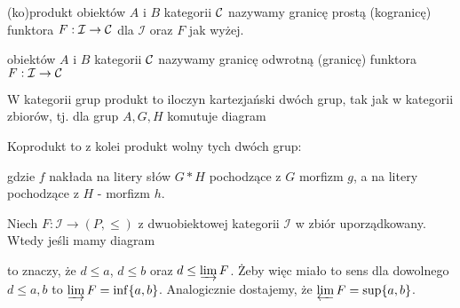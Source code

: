 {\begin{definition}{(ko)produkt}{}
   obiektów $A$ i $B$ kategorii $\mathcal{C}$ nazywamy granicę prostą (kogranicę) funktora $F:\mathcal{I}\to \mathcal{C}$ dla $\mathcal{I}$ oraz $F$ jak wyżej.

   obiektów $A$ i $B$ kategorii $\mathcal{C}$ nazywamy granicę odwrotną (granicę) funktora $F:\mathcal{I}\to\mathcal{C}$
\end{definition}

\begin{example}[m]
  \item W kategorii grup produkt to iloczyn kartezjański dwóch grup, tak jak w kategorii zbiorów, tj. dla grup $A,G,H$ komutuje diagram
    \begin{center}
    \end{center}
    Koprodukt to z kolei produkt wolny tych dwóch grup:
\begin{center}
\end{center}
gdzie $f$ nakłada na litery słów $G\ast H$ pochodzące z $G$ morfizm $g$, a na litery pochodzące z $H$ - morfizm $h$.
  \item Niech $F:\mathcal{I}\to (P, \leq)$ z dwuobiektowej kategorii $\mathcal{I}$ w zbiór uporządkowany. Wtedy jeśli mamy diagram 
    \begin{center}
    \end{center}
    to znaczy, że $d\leq a$, $d\leq b$ oraz $d\leq \varinjlim{F}$. Żeby więc miało to sens dla dowolnego $d\leq a,b$ to $\varinjlim F=\inf\{a,b\}$. Analogicznie dostajemy, że $\varprojlim F=\sup\{a,b\}$.


\end{example}}
